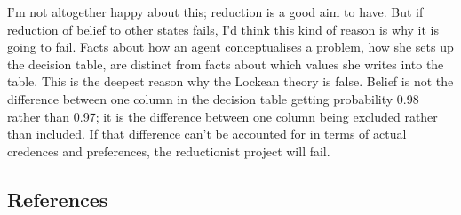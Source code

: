 \documentclass[
  10pt,
  letterpaper,
  DIV=11,
  numbers=noendperiod,
  twoside]{scrartcl}
\begin{document}
I'm not altogether happy about this; reduction is a good aim to have.
But if reduction of belief to other states fails, I'd think this kind of
reason is why it is going to fail. Facts about how an agent
conceptualises a problem, how she sets up the decision table, are
distinct from facts about which values she writes into the table. This
is the deepest reason why the Lockean theory is false. Belief is not the
difference between one column in the decision table getting probability
0.98 rather than 0.97; it is the difference between one column being
excluded rather than included. If that difference can't be accounted for
in terms of actual credences and preferences, the reductionist project
will fail.

\subsection*{References}\label{references}
\end{document}
